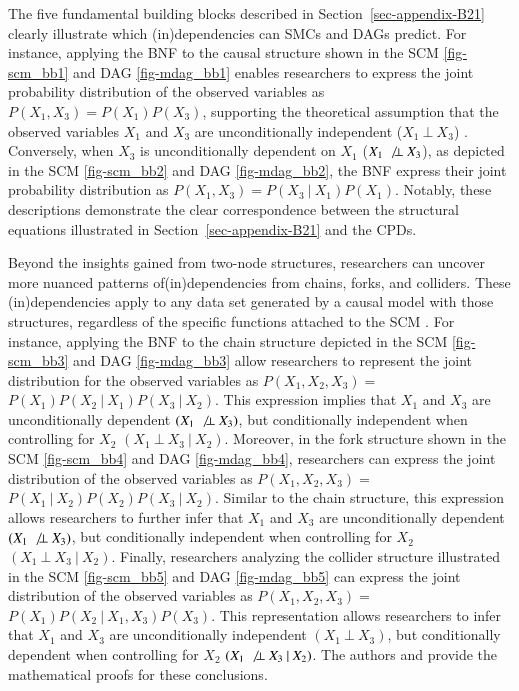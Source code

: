 \documentclass[
  authoryear,
  review,
  1p]{elsarticle}
\begin{document}
The five fundamental building blocks described in
Section~\ref{sec-appendix-B21} clearly illustrate which (in)dependencies
can SMCs and DAGs predict. For instance, applying the BNF to the causal
structure shown in the SCM \ref{fig-scm_bb1} and DAG \ref{fig-mdag_bb1}
enables researchers to express the joint probability distribution of the
observed variables as \(P(X_{1}, X_{3}) = P(X_{1}) P(X_{3})\),
supporting the theoretical assumption that the observed variables
\(X_{1}\) and \(X_{3}\) are unconditionally independent
(\(X_{1} \:\bot\:X_{3}\)) \citep[pp.~24]{Neal_2020}. Conversely, when
\(X_{3}\) is unconditionally dependent on \(X_{1}\)
(\(X_{1} \:\not\bot\:X_{3}\)), as depicted in the SCM \ref{fig-scm_bb2}
and DAG \ref{fig-mdag_bb2}, the BNF express their joint probability
distribution as \(P(X_{1}, X_{3}) = P(X_{3} \:|\:X_{1}) P(X_{1})\).
Notably, these descriptions demonstrate the clear correspondence between
the structural equations illustrated in Section~\ref{sec-appendix-B21}
and the CPDs.

Beyond the insights gained from two-node structures, researchers can
uncover more nuanced patterns of(in)dependencies from chains, forks, and
colliders. These (in)dependencies apply to any data set generated by a
causal model with those structures, regardless of the specific functions
attached to the SCM \citep[pp.~36]{Pearl_et_al_2016}. For instance,
applying the BNF to the chain structure depicted in the SCM
\ref{fig-scm_bb3} and DAG \ref{fig-mdag_bb3} allow researchers to
represent the joint distribution for the observed variables as
\(P(X_{1},X_{2},X_{3}) =\)
\(P(X_{1}) P(X_{2} \:|\:X_{1}) P(X_{3} \:|\:X_{2})\). This expression
implies that \(X_{1}\) and \(X_{3}\) are unconditionally dependent
\((X_{1} \:\not\bot\:X_{3})\), but conditionally independent when
controlling for \(X_{2}\) \((X_{1} \:\bot\:X_{3} \:|\:X_{2})\).
Moreover, in the fork structure shown in the SCM \ref{fig-scm_bb4} and
DAG \ref{fig-mdag_bb4}, researchers can express the joint distribution
of the observed variables as \(P(X_{1},X_{2},X_{3}) =\)
\(P(X_{1} \:|\:X_{2}) P(X_{2}) P(X_{3} \:|\:X_{2})\). Similar to the
chain structure, this expression allows researchers to further infer
that \(X_{1}\) and \(X_{3}\) are unconditionally dependent
\((X_{1} \:\not\bot\:X_{3})\), but conditionally independent when
controlling for \(X_{2}\) \((X_{1} \:\bot\:X_{3} \:|\:X_{2})\). Finally,
researchers analyzing the collider structure illustrated in the SCM
\ref{fig-scm_bb5} and DAG \ref{fig-mdag_bb5} can express the joint
distribution of the observed variables as \(P(X_{1},X_{2},X_{3}) =\)
\(P(X_{1}) P(X_{2} \:|\:X_{1}, X_{3}) P(X_{3})\). This representation
allows researchers to infer that \(X_{1}\) and \(X_{3}\) are
unconditionally independent \((X_{1} \:\bot\:X_{3})\), but conditionally
dependent when controlling for \(X_{2}\)
\((X_{1} \:\not\bot\:X_{3} \:|\:X_{2})\). The authors \citet[pp.~37, 40,
41]{Pearl_et_al_2016} and \citet[pp.~25--26]{Neal_2020} provide the
mathematical proofs for these conclusions.
\end{document}
